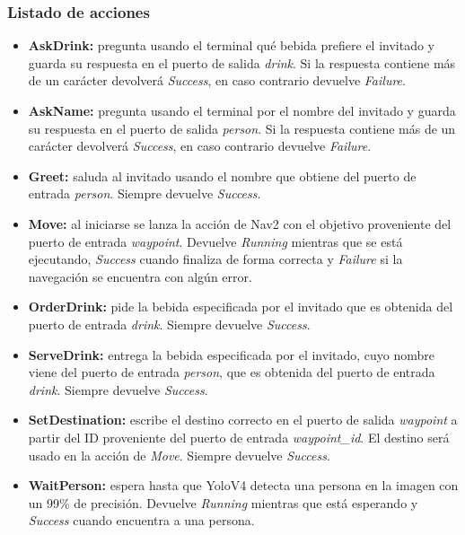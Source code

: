 \subsubsection{Listado de acciones}
\begin{itemize}
    \item \textbf{AskDrink:} pregunta usando el terminal qué bebida prefiere el invitado y guarda su respuesta en el puerto de salida \textit{drink}. Si la respuesta contiene más de un carácter devolverá \textit{Success}, en caso contrario devuelve \textit{Failure}. 
    \item \textbf{AskName:} pregunta usando el terminal por el nombre del invitado y guarda su respuesta en el puerto de salida \textit{person}. Si la respuesta contiene más de un carácter devolverá \textit{Success}, en caso contrario devuelve \textit{Failure}.
    \item \textbf{Greet:} saluda al invitado usando el nombre que obtiene del puerto de entrada \textit{person}. Siempre devuelve \textit{Success}.
    \item \textbf{Move:} al iniciarse se lanza la acción de Nav2 con el objetivo proveniente del puerto de entrada \textit{waypoint}. Devuelve \textit{Running} mientras que se está ejecutando, \textit{Success} cuando finaliza de forma correcta y \textit{Failure} si la navegación se encuentra con algún error.
    \item \textbf{OrderDrink:} pide la bebida especificada por el invitado que es obtenida del puerto de entrada \textit{drink}. Siempre devuelve \textit{Success}.
    \item \textbf{ServeDrink:} entrega la bebida especificada por el invitado, cuyo nombre viene del puerto de entrada \textit{person}, que es obtenida del puerto de entrada \textit{drink}. Siempre devuelve \textit{Success}.
    \item \textbf{SetDestination:} escribe el destino correcto en el puerto de salida \textit{waypoint} a partir del ID proveniente del puerto de entrada \textit{waypoint\_id}. El destino será usado en la acción de \textit{Move}. Siempre devuelve \textit{Success}.
    \item \textbf{WaitPerson:} espera hasta que YoloV4 detecta una persona en la imagen con un 99\% de precisión. Devuelve \textit{Running} mientras que está esperando y \textit{Success} cuando encuentra a una persona.
\end{itemize}

